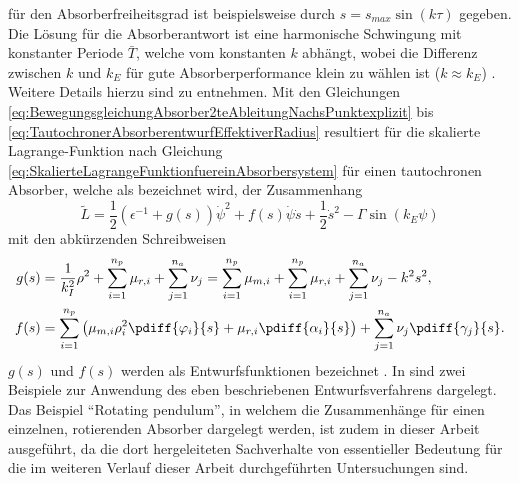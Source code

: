 für den Absorberfreiheitsgrad ist beispielsweise durch $s = s_{max} \sin(k\tau)$ gegeben. 
Die Lösung für die Absorberantwort ist eine harmonische Schwingung mit konstanter Periode $\bar{T}$, 
welche vom konstanten  $k$ abhängt, wobei die Differenz zwischen $k$ und $k_E$ für gute Absorberperformance
klein zu wählen ist ($k \approx k_E$) \cite{Mayet:Tautochronic}. 
Weitere Details hierzu sind \cite{Mayet:Tautochronic} zu entnehmen. 
%
%
%
%
%
%
%
%
%
%
%
%
%
%
%
%
%
%
%
%
%
%
%
%
%
%
Mit den Gleichungen \eqref{eq:BewegungsgleichungAbsorber2teAbleitungNachsPunktexplizit}  
bis \eqref{eq:TautochronerAbsorberentwurfEffektiverRadius} resultiert für die skalierte Lagrange-Funktion 
nach Gleichung \eqref{eq:SkalierteLagrangeFunktionfuereinAbsorbersystem} für einen tautochronen Absorber, 
welche als  \cite{Mayet:Tautochronic} bezeichnet wird, der Zusammenhang
%
%
%
%
\begin{equation}
	\tilde{L} = \frac{1}{2} \left(\epsilon^{-1} + g(s) \right)\dot{\psi}^2 + f(s) \dot{\psi} \dot{s} + \frac{1}{2} \dot{s}^2 - \Gamma \sin\left( k_E \psi \right)
\label{eq:SkalierteLagrangeFunktionfuereinAbsorbersystemMitfUndg}
\end{equation}
%
%
%
mit den abkürzenden Schreibweisen
\begin{align}
	g(s) &= \frac{1}{k_I^2}\rho^2 + \sum^{n_p}_{i=1}{\mu_{r,i}} + \sum^{n_a}_{j=1}{\nu_j}
									 = \sum^{n_p}_{i=1}{\mu_{m,i}} + \sum^{n_p}_{i=1}{\mu_{r,i}} + \sum^{n_a}_{j=1}{\nu_j} - k^2 s^2,  \label{eq:Abkuerzungenfuerg} \\ 
	f(s)	&= \sum^{n_p}_{i=1}{\left(\mu_{m,i} \rho_i^2 \pdiff{\varphi_i}{s} + \mu_{r,i} \pdiff{\alpha_i}{s}  \right)} + \sum^{n_a}_{j=1}{\nu_j \pdiff{\gamma_j}{s}}.
	\label{eq:Abkuerzungenfuerf}
\end{align}
$g(s)$ und $f(s)$ werden als Entwurfsfunktionen bezeichnet \cite{Mayet:Tautochronic}.
In \cite{Mayet:Tautochronic} sind zwei Beispiele zur Anwendung des eben 
beschriebenen Entwurfsverfahrens dargelegt.
Das Beispiel "`Rotating pendulum"', in welchem die Zusammenhänge für einen einzelnen, rotierenden Absorber 
dargelegt werden, ist zudem in  dieser Arbeit ausgeführt, da die dort hergeleiteten Sachverhalte 
von essentieller  Bedeutung für die im weiteren Verlauf dieser Arbeit durchgeführten Untersuchungen sind.









